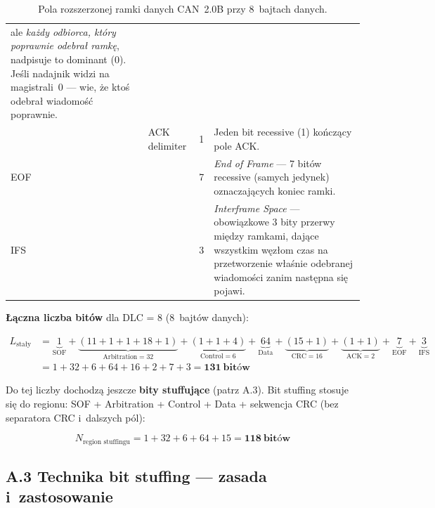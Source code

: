 \documentclass[12pt,a4paper]{article}
\begin{document}
\begin{table}[H]
\begin{tabular}{llrp{6.5cm}}
                  ale \emph{każdy odbiorca, który poprawnie odebrał ramkę},
                  nadpisuje to dominant (0). Jeśli nadajnik widzi na magistrali~0
                  — wie, że ktoś odebrał wiadomość poprawnie. \\
 & ACK delimiter & 1 & Jeden bit recessive (1) kończący pole ACK. \\
\midrule
EOF & & 7 & \textit{End of Frame} — 7 bitów recessive (samych jedynek)
            oznaczających koniec ramki. \\
\midrule
IFS & & 3 & \textit{Interframe Space} — obowiązkowe 3 bity przerwy między
            ramkami, dające wszystkim węzłom czas na przetworzenie właśnie
            odebranej wiadomości zanim następna się pojawi. \\
\bottomrule
\end{tabular}
\caption{Pola rozszerzonej ramki danych CAN~2.0B przy 8~bajtach danych.}
\end{table}

\textbf{Łączna liczba bitów} dla DLC = 8 (8~bajtów danych):

\begin{align*}
L_{\text{stały}} &= \underbrace{1}_{\text{SOF}}
                 + \underbrace{(11+1+1+18+1)}_{\text{Arbitration}=32}
                 + \underbrace{(1+1+4)}_{\text{Control}=6}
                 + \underbrace{64}_{\text{Data}}
                 + \underbrace{(15+1)}_{\text{CRC}=16}
                 + \underbrace{(1+1)}_{\text{ACK}=2}
                 + \underbrace{7}_{\text{EOF}}
                 + \underbrace{3}_{\text{IFS}} \\
                 &= 1 + 32 + 6 + 64 + 16 + 2 + 7 + 3 = \mathbf{131\ \text{bitów}}
\end{align*}

Do tej liczby dochodzą jeszcze \textbf{bity stuffujące} (patrz A.3).
Bit stuffing stosuje się do regionu: SOF + Arbitration + Control + Data +
sekwencja CRC (bez separatora CRC i~dalszych pól):

\begin{equation}
N_{\text{region stuffingu}} = 1 + 32 + 6 + 64 + 15 = \mathbf{118\ \text{bitów}}
\end{equation}

\subsection*{A.3 Technika bit stuffing — zasada i~zastosowanie}
\end{document}
